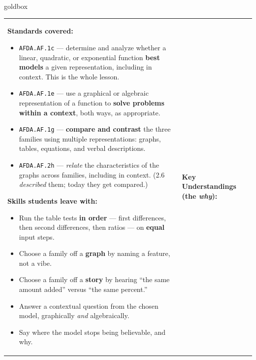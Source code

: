 \documentclass[10pt]{article}
\begin{document}
\renewcommand{\arraystretch}{1.6}
\begin{skillbox}{goldbox}
\begin{tabularx}{\linewidth}{@{}X|X@{}}
\begin{minipage}[t]{\linewidth}\vspace{0pt}
\textbf{Standards covered:}
\begin{itemize}[leftmargin=1.1em, itemsep=2pt, topsep=2pt]
  \item \texttt{AFDA.AF.1c} --- determine and analyze whether a linear, quadratic, or exponential
        function \textbf{best models} a given representation, including in context. This is the whole
        lesson.
  \item \texttt{AFDA.AF.1e} --- use a graphical or algebraic representation of a function to
        \textbf{solve problems within a context}, both ways, as appropriate.
  \item \texttt{AFDA.AF.1g} --- \textbf{compare and contrast} the three families using multiple
        representations: graphs, tables, equations, and verbal descriptions.
  \item \texttt{AFDA.AF.2h} --- \emph{relate} the characteristics of the graphs across families,
        including in context. (2.6 \emph{described} them; today they get compared.)
\end{itemize}
\textbf{Skills students leave with:}
\begin{itemize}[leftmargin=1.1em, itemsep=2pt, topsep=2pt]
  \item Run the table tests \textbf{in order} --- first differences, then second differences, then
        ratios --- on \textbf{equal} input steps.
  \item Choose a family off a \textbf{graph} by naming a feature, not a vibe.
  \item Choose a family off a \textbf{story} by hearing ``the same amount added'' versus ``the same
        percent.''
  \item Answer a contextual question from the chosen model, graphically \emph{and} algebraically.
  \item Say where the model stops being believable, and why.
\end{itemize}
\end{minipage}
&
\begin{minipage}[t]{\linewidth}\vspace{0pt}
\textbf{Key Understandings (the \emph{why}):}
\begin{itemize}[leftmargin=1.1em, itemsep=2pt, topsep=2pt]

\end{itemize}
\end{minipage}
\end{tabularx}
\end{skillbox}
\end{document}
